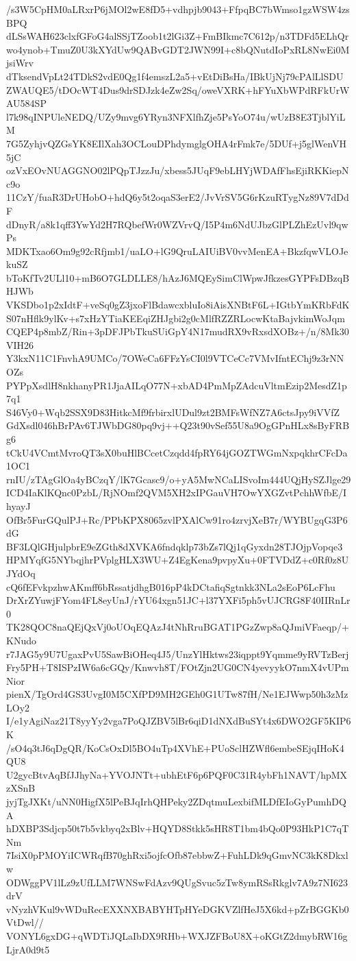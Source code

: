 /s3W5CpHM0aLRxrP6jMOl2wE8fD5+vdhpjb9043+FfpqBC7bWmso1gzWSW4zsBPQ
dLSsWAH623clxfGFoG4alSSjTZoob1t2lGi3Z+FmBIkmc7C612p/n3TDFd5ELhQr
wo4ynob+TmuZ0U3kXYdUw9QABvGDT2JWN99I+c8bQNutdIoPxRL8NwEi0MjsiWrv
dTksendVpLt24TDkS2vdE0Qg1f4emszL2a5+vEtDiBsHa/IBkUjNj79cPAlLlSDU
ZWAUQE5/tDOcWT4Dus9drSDJzk4eZw2Sq/oweVXRK+hFYuXbWPdRFkUrWAU584SP
l7k98qINPUleNEDQ/UZy9mvg6YRyn3NFXlfhZje5PsYoO74u/wUzB8E3TjblYiLM
7G5ZyhjvQZGsYK8EIlXah3OCLouDPhdymglgOHA4rFmk7e/5DUf+j5glWenVH5jC
ozVxEOvNUAGGNO02lPQpTJzzJu/xbess5JUqF9ebLHYjWDAfFhsEjiRKKiepNc9o
11CzY/fuaR3DrUHobO+hdQ6y5t2oqaS3erE2/JvVrSV5G6rKzuRTygNz89V7dDdF
dDnyR/a8k1qff3YwYd2H7RQbefWr0WZVrvQ/I5P4m6NdUJbzGlPLZhEzUvl9qwPs
MDKTxao6Om9g92cRfjmb1/uaLO+lG9QruLAIUiBV0vvMenEA+BkzfqwVLOJekuSZ
bToKfTv2ULl10+mB6O7GLDLLE8/hAzJ6MQEySimClWpwJfkzesGYPFsDBzqBHJWb
VKSDbo1p2xIdtF+veSq0gZ3jxoFlBdawcxbluIo8iAisXNBtF6L+IGtbYmKRbFdK
S07nHflk9ylKv+s7xHzYTiaKEEqiZHJgbi2g0cMlfRZZRLocwKtaBajvkimWoJqm
CQEP4p8mbZ/Rin+3pDFJPbTkuSUiGpY4N17mudRX9vRxsdXOBz+/n/8Mk30VIH26
Y3kxN11C1FnvhA9UMCo/7OWeCa6FFzYsCI0l9VTCeCc7VMvIfntEChj9z3rNNOZs
PYPpXsdlH8nkhanyPR1JjaAILqO77N+xbAD4PmMpZAdcuVltmEzip2MesdZ1p7q1
S46Vy0+Wqb2SSX9D83HitkcMf9frbirxlUDul9zt2BMFsWfNZ7A6ctsJpy9iVVfZ
GdXsdl046hBrPAv6TJWbDG80pq9vj++Q23t90vSef55U8a9OgGPnHLx8sByFRBg6
tCkU4VCmtMvroQT3sX0buHlBCcetCzqdd4fpRY64jGOZTWGmNxpqkhrCFcDa1OC1
rnIU/zTAgGlOa4yBCzqY/lK7Gcasc9/o+yA5MwNCaLISvoIm444UQjHySZJlge29
ICD4IaKlKQnc0PzbL/RjNOmf2QVM5XH2xIPGauVH7OwYXGZvtPchhWfbE/IhyayJ
OfBr5FurGQulPJ+Rc/PPbKPX8065zvlPXAlCw91ro4zrvjXeB7r/WYBUgqG3P6dG
BF3LQlGHjulpbrE9eZGth8dXVKA6fndqklp73bZs7lQj1qGyxdn28TJOjpVopqe3
HPMYqfG5NYbqjhrPVplgHLX3WU+Z4EgKena9pvpyXu+0FTVDdZ+c0Rf0z8UJYdOq
cQ6fEFvkpzhwAKmff6bRssatjdhgB016pP4kDCtafiqSgtnkk3NLa2sEoP6LcFhu
DrXrZYuwjFYom4FL8eyUnJ/rYU64xgn51JC+l37YXFi5ph5vUJCRG8F40IIRnLr0
TK28QOC8naQEjQxVj0oUOqEQAzJ4tNhRruBGAT1PGzZwp8aQJmiVFaeqp/+KNudo
r7JAG5y9U7UgaxPvU5SawBiOHeq4J5/UnzYlHktws23iqppt9Yqmme9yRVTzBerj
Fry5PH+T8ISPzIW6a6cGQy/Knwvh8T/FOtZjn2UG0CN4yevyykO7nmX4vUPmNior
pienX/TgOrd4GS3UvgI0M5CXfPD9MH2GEh0G1UTw87fH/Ne1EJWwp50h3zMzLOy2
I/e1yAgiNaz21T8yyYy2vga7PoQJZBV5lBr6qiD1dNXdBuSYt4x6DWO2GF5KIP6K
/sO4q3tJ6qDgQR/KoCsOxDl5BO4uTp4XVhE+PUoSclHZWfl6embeSEjqIHoK4QU8
U2gycBtvAqBfJJhyNa+YVOJNTt+ubhEtF6p6PQF0C31R4ybFh1NAVT/hpMXzXSnB
jyjTgJXKt/uNN0HigfX5lPeBJqIrhQHPeky2ZDqtmuLexbifMLDfEIoGyPumhDQA
hDXBP3Sdjcp50t7b5vkbyq2xBlv+HQYD8Stkk5sHR8T1bm4bQo0P93HkP1C7qTNm
7IsiX0pPMOYiICWRqfB70ghRxi5ojfcOfb87ebbwZ+FuhLDk9qGmvNC3kK8Dkxlw
ODWggPV1lLz9zUfLLM7WNSwFdAzv9QUgSvuc5zTw8ymRSsRkglv7A9z7NI623drV
vNyzhVKul9vWDuRecEXXNXBABYHTpHYeDGKVZlfHeJ5X6kd+pZrBGGKb0VtDwl//
VONYL6gxDG+qWDTiJQLaIbDX9RHb+WXJZFBoU8X+oKGtZ2dmybRW16gLjrA0d9t5
